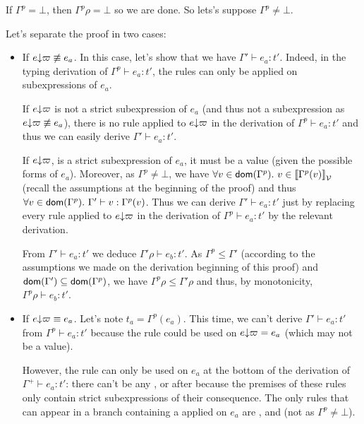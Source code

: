 \documentclass[a4paper]{article}
\theoremstyle{definition}
\begin{document}
\begin{description}
          If $\Gamma^p = \bot$, then $\Gamma^p\rho = \bot$ so we are done. So lets's suppose $\Gamma^p \neq \bot$.

          Let's separate the proof in two cases:
          \begin{itemize}
            \item If $e{\downarrow}\varpi \not\equiv e_a$. In this case, let's show that we have  $\Gamma'\vdash e_a:t'$.
            Indeed, in the typing derivation of $\Gamma^p\vdash e_a:t'$, the  rules can only be applied on
            subexpressions of $e_a$.
            
            If $e{\downarrow}\varpi$ is not a strict subexpression of $e_a$
            (and thus not a subexpression as $e{\downarrow}\varpi \not\equiv e_a$), there is no  rule applied to $e{\downarrow}\varpi$
            in the derivation of $\Gamma^p\vdash e_a:t'$ and thus we can easily derive $\Gamma'\vdash e_a:t'$.

            If $e{\downarrow}\varpi$, is a strict subexpression of $e_a$, it must be a value (given the possible forms of $e_a$).
            Moreover, as $\Gamma^p \neq \bot$, we have $\forall v\in\dom{\Gamma^p}.\ v\in\valsemantic{\Gamma^p(v)}$ (recall the assumptions at the beginning of the proof)
            and thus $\forall v\in\textsf{dom}(\Gamma^p).\ \Gamma'\vdash v : \Gamma^p(v)$.
            Thus we can derive $\Gamma'\vdash e_a:t'$ just by replacing every  rule applied to $e{\downarrow}\varpi$ in the derivation of $\Gamma^p\vdash e_a:t'$
            by the relevant derivation.

            From $\Gamma'\vdash e_a:t'$ we deduce $\Gamma'\rho\vdash e_b:t'$.
            As $\Gamma^p\leq\Gamma'$ (according to the assumptions we made on the derivation beginning of this proof)
            and $\textsf{dom}(\Gamma')\subseteq\textsf{dom}(\Gamma^p)$, we have $\Gamma^p\rho\leq\Gamma'\rho$ and thus, by monotonicity,
            $\Gamma^p\rho\vdash e_b:t'$.

            \item            
            If $e{\downarrow}\varpi \equiv e_a$. Let's note $t_a=\Gamma^p(e_a)$. This time,
            we can't derive $\Gamma'\vdash e_a:t'$ from $\Gamma^p\vdash e_a:t'$ because the rule 
            could be used on $e{\downarrow}\varpi=e_a$ (which may not be a value).

            However, the rule  can only be used on $e_a$ at the bottom of the derivation of $\Gamma^+\vdash e_a:t'$:
            there can't be any ,  or  after because the premises of these rules only contain strict subexpressions of their
            consequence. The only rules that can appear in a branch containing a  applied on $e_a$ are ,  and 
            (not  as $\Gamma^p \neq \bot$).


\end{itemize}
\end{description}
\end{document}
